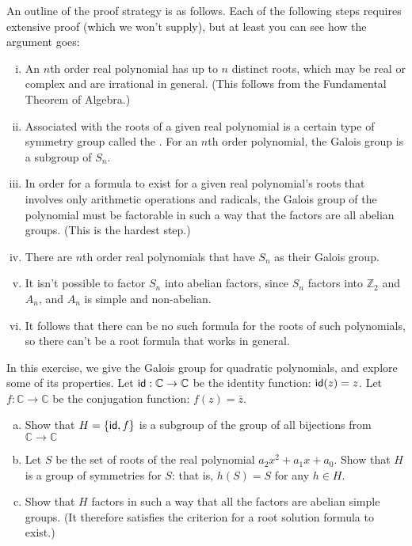 An outline of the proof strategy is as follows. Each of the following steps requires extensive proof (which we won't supply), but at least you can see how the argument goes:
\begin{enumerate}[(i)]
\item
An $n$th order real polynomial has up to $n$ distinct roots, which may be real or complex and are irrational in general. (This follows from the Fundamental Theorem of Algebra.)
\item 
Associated with the roots of a given real polynomial  is a certain type of symmetry group called the . For an $n$th order polynomial, the Galois group is a subgroup of $S_n$. 
\item
In order for a formula to exist for a given real polynomial's roots that involves only arithmetic operations and radicals, the Galois group of the polynomial must be factorable in such a way that the factors are all abelian groups.  (This is the hardest step.) 
\item
There are $n$th order real polynomials that have $S_n$ as their Galois group. 
\item
It isn't possible to factor $S_n$ into abelian factors, since $S_n$ factors into $\mathbb{Z}_2$ and $A_n$, and $A_n$ is simple and non-abelian.  
\item
It follows that there can be no such formula for the roots of such polynomials, so there can't be a root formula that works in general.
\end{enumerate}

\begin{exercise}{}
In this exercise, we give the Galois group for quadratic polynomials, and explore some of its properties.  Let ${\sf{i}d}:\mathbb{C} \rightarrow \mathbb{C}$ be the identity function:  ${\sf{i}d}(z) = z$.  Let $f:\mathbb{C} \rightarrow \mathbb{C}$ be the conjugation function:  $f(z) = \bar{z}$. 
\begin{enumerate}[(a)]
\item
Show that $H=\{ {\sf{i}d}, f \}$ is a subgroup of the group of all bijections from $\mathbb{C} \rightarrow \mathbb{C}$
\item
Let $S$ be the set of roots of the real polynomial  $a_2x^2 + a_1x + a_0$.  Show that $H$ is a group of symmetries for $S$: that is, $h(S)=S$ for any $h \in H$.
\item
Show that $H$ factors in such a way that all the factors are abelian simple groups. (It therefore satisfies the criterion for a root solution formula to exist.)
\end{enumerate}
\end{exercise}

